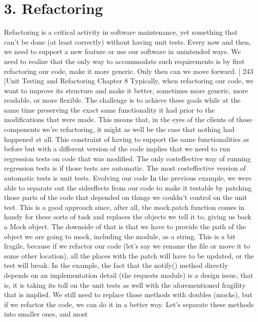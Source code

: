 \documentclass[a4paper,10pt,english]{sphinxmanual}
\begin{document}
\section{3. Refactoring}
\label{\detokenize{chapters/8_unit_testing/index:refactoring}}
Refactoring is a critical activity in software maintenance, yet something that can’t be done
(at least correctly) without having unit tests. Every now and then, we need to support a
new feature or use our software in unintended ways. We need to realize that the only way
to accommodate such requirements is by first refactoring our code, make it more generic.
Only then can we move forward.
{[} 243 {]}Unit Testing and Refactoring
Chapter 8
Typically, when refactoring our code, we want to improve its structure and make it better,
sometimes more generic, more readable, or more flexible. The challenge is to achieve these
goals while at the same time preserving the exact same functionality it had prior to the
modifications that were made. This means that, in the eyes of the clients of those
components we’re refactoring, it might as well be the case that nothing had happened at all.
This constraint of having to support the same functionalities as before but with a different
version of the code implies that we need to run regression tests on code that was modified.
The only cost\sphinxhyphen{}effective way of running regression tests is if those tests are automatic. The
most cost\sphinxhyphen{}effective version of automatic tests is unit tests.
Evolving our code
In the previous example, we were able to separate out the side\sphinxhyphen{}effects from our code to
make it testable by patching those parts of the code that depended on things we couldn’t
control on the unit test. This is a good approach since, after all, the mock.patch function
comes in handy for these sorts of task and replaces the objects we tell it to, giving us back a
Mock object.
The downside of that is that we have to provide the path of the object we are going to
mock, including the module, as a string. This is a bit fragile, because if we refactor our code
(let’s say we rename the file or move it to some other location), all the places with the patch
will have to be updated, or the test will break.
In the example, the fact that the notify() method directly depends on an implementation
detail (the requests module) is a design issue, that is, it is taking its toll on the unit tests as
well with the aforementioned fragility that is implied.
We still need to replace those methods with doubles (mocks), but if we refactor the code,
we can do it in a better way. Let’s separate these methods into smaller ones, and most
\end{document}
